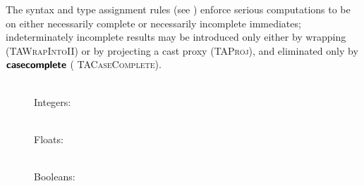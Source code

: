 \documentclass[index.tex]{subfiles}
\begin{document}
The syntax and type assignment rules (see ) enforce serious computations to be
on either necessarily complete or necessarily incomplete immediates; indeterminately incomplete
results may be introduced only either by wrapping (\textsc{\small TAWrapIntoII}) or by projecting a
cast proxy (\textsc{\small TAProj}), and eliminated only by $\textsf{\textbf{casecomplete}}$ (\textsc{\small
TACaseComplete}).

\begin{figure}
  \judgbox{\hasTypeCtx{\CtxVar}{\HoleCtxVar}{\SortCompVar}{\SortTypVar}} \\

  Integers:
   \\
  Floats:
   \\
  Booleans:
\end{figure}
\end{document}
